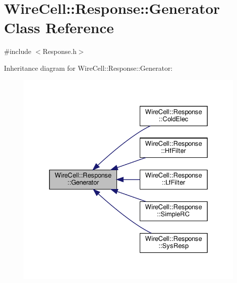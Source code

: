 \hypertarget{class_wire_cell_1_1_response_1_1_generator}{}\section{Wire\+Cell\+:\+:Response\+:\+:Generator Class Reference}
\label{class_wire_cell_1_1_response_1_1_generator}


{\ttfamily \#include $<$Response.\+h$>$}



Inheritance diagram for Wire\+Cell\+:\+:Response\+:\+:Generator\+:
\nopagebreak
\begin{figure}[H]
\begin{center}
\leavevmode
\includegraphics[width=324pt]{class_wire_cell_1_1_response_1_1_generator__inherit__graph}
\end{center}
\end{figure}
